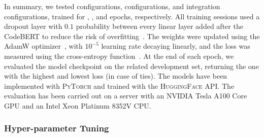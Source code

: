 In summary, we tested \finderConfigsLetter \finder configurations, \linkerConfigsLetter \linker configurations, and \globalConfigs integration configurations, trained for \finderTrainingEpochs, \linkerTrainingEpochs, and \globalTrainingEpochs epochs, respectively.
All training sessions used a dropout layer with $0.1$ probability between every linear layer added after the CodeBERT to reduce the risk of overfitting~\cite{hinton2012improving:dropout}.
The weights were updated using the AdamW optimizer~\cite{loshchilov2019decoupled:adamw}, with $10^{-5}$ learning rate decaying linearly, and the loss was measured using the cross-entropy function~\cite{Zhang2018:cross:entropy}.
At the end of each epoch, we evaluated the model checkpoint on the related development set, returning the one with the highest \metricForDev and lowest loss (in case of ties).
The models have been implemented with \textsc{PyTorch} and trained with the \textsc{HuggingFace} API.
The evaluation has been carried out on a server with an NVIDIA Tesla A100 Core GPU and an Intel Xeon Platinum 8352V CPU.

\subsubsection{Hyper-parameter Tuning}
\label{subsub:hyperparams}

